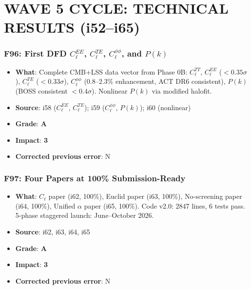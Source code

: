 \documentclass[11pt,a4paper]{article}
\newcommand{\grade}[1]{\textbf{#1}}
\newcommand{\impact}[1]{\textbf{#1}}
\begin{document}
\part{WAVE 5 CYCLE: TECHNICAL RESULTS (i52--i65)}
\label{part:wave5technical}

\section{F96: First DFD $C_\ell^{EE}$, $C_\ell^{TE}$, $C_\ell^{\phi\phi}$, and $P(k)$}
\begin{itemize}[nosep]
\item \textbf{What}: Complete CMB+LSS data vector from Phase 0B: $C_\ell^{TT}$, $C_\ell^{EE}$ ($< 0.35\sigma$), $C_\ell^{TE}$ ($< 0.33\sigma$), $C_\ell^{\phi\phi}$ (0.8--2.3\% enhancement, ACT DR6 consistent), $P(k)$ (BOSS consistent $< 0.4\sigma$). Nonlinear $P(k)$ via modified halofit.
\item \textbf{Source}: i58 ($C_\ell^{EE}$, $C_\ell^{TE}$); i59 ($C_\ell^{\phi\phi}$, $P(k)$); i60 (nonlinear)
\item \textbf{Grade}: \grade{A}
\item \textbf{Impact}: \impact{3}
\item \textbf{Corrected previous error}: N
\end{itemize}

\section{F97: Four Papers at 100\% Submission-Ready}
\begin{itemize}[nosep]
\item \textbf{What}: $C_\ell$ paper (i62, 100\%), Euclid paper (i63, 100\%), No-screening paper (i64, 100\%), Unified $\alpha$ paper (i65, 100\%). Code v2.0: 2847 lines, 6 tests pass. 5-phase staggered launch: June--October 2026.
\item \textbf{Source}: i62, i63, i64, i65
\item \textbf{Grade}: \grade{A}
\item \textbf{Impact}: \impact{3}
\item \textbf{Corrected previous error}: N
\end{itemize}
\end{document}
